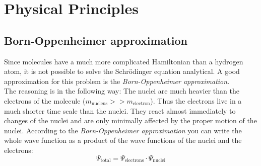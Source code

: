\section{Physical Principles}
\subsection{Born-Oppenheimer approximation}
Since molecules have a much more complicated Hamiltonian than a hydrogen atom, it is not possible to solve the Schrödinger equation analytical. 
A good approximation for this problem is the \emph{Born-Oppenheimer approximation}.  \\
The reasoning is in the following way: The nuclei are much heavier than the electrons of the molecule ($m_{\text{nucleus}} >> m_{\text{electron}}$). 
Thus the electrons live in a much shorter time scale than the nuclei. They react almost immediately to 
changes of the nuclei and are only minimally affected by the proper motion of the nuclei. According to the \emph{Born-Oppenheimer approximation} 
you can write the whole wave function as a product of the wave functions of the nuclei and the electrons:
\begin{equation}
  \Psi_{\text{total}} = \Psi_{\text{electrons}} \cdot \Psi_{\text{nuclei}}
\end{equation}

